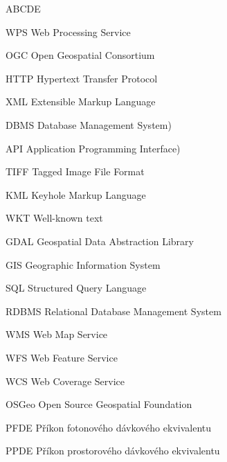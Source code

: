 
\begin{seznamzkratek}{ABCDE}
	      
	     {WPS}
	     {Web Processing Service}	  
	     
	      {OGC}
	      {Open Geospatial Consortium}
	      
	      {HTTP}
	      {Hypertext Transfer Protocol}	         
	      
		  {XML}
	      {Extensible Markup Language}

	      {DBMS}
	      {Database Management System)}
	         
	      {API}
	      {Application Programming Interface)}
	           
	      {TIFF}
	      {Tagged Image File Format}

	      {KML}
	      {Keyhole Markup Language}
	      
	      {WKT}
	      {Well-known text}	      
	      
	      {GDAL}
	      {Geospatial Data Abstraction Library}
	    
	      {GIS}
	      {Geographic Information System}
	     
	      {SQL}
	      {Structured Query Language}
	      
	 
	 
	 
	      
	      {RDBMS}
	      {Relational Database Management System}	
	      
	      {WMS}
	      {Web Map Service}	
	      
	      {WFS}
	      {Web Feature Service}     
	      
	      {WCS}
	      {Web Coverage Service}
	      	      
	      	      
	      	      
	      {OSGeo}
	      {Open Source Geospatial Foundation} 	  
	     	  
	      {PFDE}
	      {Příkon fotonového dávkového ekvivalentu}
	     	  
	      {PPDE}
	      {Příkon prostorového dávkového ekvivalentu}
	     	  

\end{seznamzkratek}
